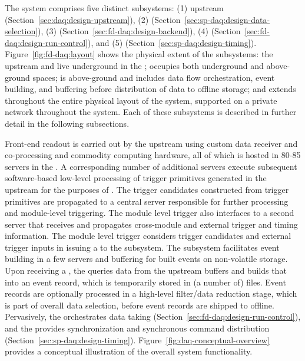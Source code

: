 The   system comprises five distinct subsystems:
%
(1) upstream  (Section~\ref{sec:daq:design-upstream}),
%
(2)  (Section~\ref{sec:sp-daq:design-data-selection}),
%
(3)  (Section~\ref{sec:fd-daq:design-backend}), 
%
(4)  (Section~\ref{sec:fd-daq:design-run-control}), and
%
(5)  (Section~\ref{sec:sp-daq:design-timing}).
%
Figure~\ref{fig:fd-daq:layout} shows the physical extent of the subsystems: the
upstream  and   live underground in the ;  occupies
both underground and above-ground spaces;  is above-ground
and includes data flow orchestration, event building, and buffering before distribution of data
to offline storage; and  extends throughout the entire physical layout of the
system, supported on a private network throughout the  system. Each of these subsystems is described in further
detail in the following subsections. 

Front-end readout is carried out by the upstream  using custom data receiver and
co-processing  and commodity computing hardware, all of which is hosted in 80-85 servers in the . A
corresponding number of additional servers execute
subsequent software-based low-level processing of trigger
primitives
generated in the upstream  for the purposes of . The trigger candidates constructed from trigger primitives are propagated to a central server responsible
for further processing and module-level triggering. The module level
trigger also
interfaces to a second server that receives and
propagates cross-module and external trigger and timing
information. The module level trigger considers trigger candidates and
external trigger inputs in issuing a  to the 
subsystem. The  subsystem 
facilitates event building in a few servers and buffering for built
events on non-volatile storage. Upon receiving a , the 
 queries
data from the upstream  buffers and builds that into an event
record, which is temporarily stored in (a number of) files. Event records are optionally processed in a high-level
filter/data reduction stage, which is part of overall data selection,
 before event records are shipped to  offline. Pervasively,
 the   orchestrates data taking 
 (Section~\ref{sec:fd-daq:design-run-control}), and the
  provides synchronization and synchronous command distribution
 (Section~\ref{sec:sp-daq:design-timing}). Figure~\ref{fig:daq-conceptual-overview}
 provides a conceptual illustration of the overall  system
 functionality.

